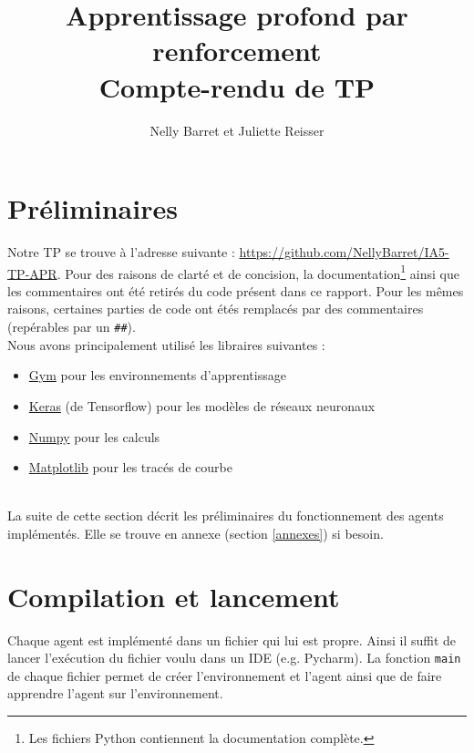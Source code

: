 \documentclass[10pt,a4paper]{article}
\title{Apprentissage profond par renforcement \\ Compte-rendu de TP}
\author{Nelly Barret et Juliette Reisser}
\begin{document}
\maketitle

\tableofcontents

\section{Préliminaires} \label{prelim}
Notre TP se trouve à l'adresse suivante : \href{https://github.com/NellyBarret/IA5-TP-APR}{https://github.com/NellyBarret/IA5-TP-APR}. Pour des raisons de clarté et de concision, la documentation\footnote{Les fichiers Python contiennent la documentation complète.} ainsi que les commentaires ont été retirés du code présent dans ce rapport. Pour les mêmes raisons, certaines parties de code ont étés remplacés par des commentaires (repérables par un \lstinline{##}). \\

Nous avons principalement utilisé les libraires suivantes :
\begin{itemize}
	\item \href{https://gym.openai.com/}{Gym} pour les environnements d'apprentissage
	\item \href{https://keras.io/}{Keras} (de Tensorflow) pour les modèles de réseaux neuronaux
	\item \href{https://numpy.org/}{Numpy} pour les calculs
	\item \href{https://matplotlib.org/index.html}{Matplotlib} pour les tracés de courbe
\end{itemize}
~\\

La suite de cette section décrit les préliminaires du fonctionnement des agents implémentés. Elle se trouve en annexe (section \ref{annexes}) si besoin.


\section{Compilation et lancement}

Chaque agent est implémenté dans un fichier qui lui est propre. Ainsi il suffit de lancer l'exécution du fichier voulu dans un IDE (e.g. Pycharm). La fonction \lstinline{main} de chaque fichier permet de créer l'environnement et l'agent ainsi que de faire apprendre l'agent sur l'environnement.
\end{document}
